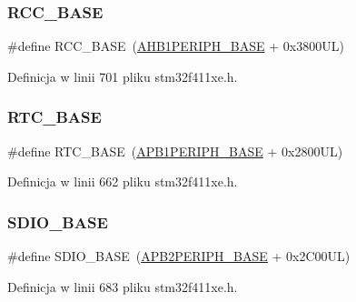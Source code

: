 \subsubsection{\texorpdfstring{R\+C\+C\+\_\+\+B\+A\+SE}{RCC\_BASE}}
{\footnotesize\ttfamily \#define R\+C\+C\+\_\+\+B\+A\+SE~(\hyperlink{group___peripheral__memory__map_ga811a9a4ca17f0a50354a9169541d56c4}{A\+H\+B1\+P\+E\+R\+I\+P\+H\+\_\+\+B\+A\+SE} + 0x3800\+U\+L)}



Definicja w linii 701 pliku stm32f411xe.\+h.

\mbox{\label{group___peripheral__memory__map_ga4265e665d56225412e57a61d87417022}} 
\subsubsection{\texorpdfstring{R\+T\+C\+\_\+\+B\+A\+SE}{RTC\_BASE}}
{\footnotesize\ttfamily \#define R\+T\+C\+\_\+\+B\+A\+SE~(\hyperlink{group___peripheral__memory__map_ga45666d911f39addd4c8c0a0ac3388cfb}{A\+P\+B1\+P\+E\+R\+I\+P\+H\+\_\+\+B\+A\+SE} + 0x2800\+U\+L)}



Definicja w linii 662 pliku stm32f411xe.\+h.

\mbox{\label{group___peripheral__memory__map_ga95dd0abbc6767893b4b02935fa846f52}} 
\subsubsection{\texorpdfstring{S\+D\+I\+O\+\_\+\+B\+A\+SE}{SDIO\_BASE}}
{\footnotesize\ttfamily \#define S\+D\+I\+O\+\_\+\+B\+A\+SE~(\hyperlink{group___peripheral__memory__map_ga25b99d6065f1c8f751e78f43ade652cb}{A\+P\+B2\+P\+E\+R\+I\+P\+H\+\_\+\+B\+A\+SE} + 0x2\+C00\+U\+L)}



Definicja w linii 683 pliku stm32f411xe.\+h.

